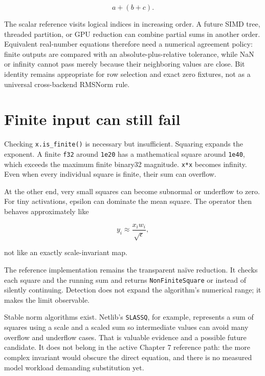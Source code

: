 \begin{equation}
a+(b+c).
\end{equation}

The scalar reference visits logical indices in increasing order. A
future SIMD tree, threaded partition, or GPU reduction can combine
partial sums in another order. Equivalent real-number equations
therefore need a numerical agreement policy: finite outputs are compared
with an absolute-plus-relative tolerance, while NaN or infinity cannot
pass merely because their neighboring values are close. Bit identity
remains appropriate for row selection and exact zero fixtures, not as a
universal cross-backend RMSNorm rule.

\section{Finite input can still
fail}\label{finite-input-can-still-fail}


Checking \texttt{x.is\_finite()} is necessary but insufficient. Squaring
expands the exponent. A finite \texttt{f32} around \texttt{1e20} has a
mathematical square around \texttt{1e40}, which exceeds the maximum
finite binary32 magnitude. \texttt{x*x} becomes infinity. Even when
every individual square is finite, their sum can overflow.

At the other end, very small squares can become subnormal or underflow
to zero. For tiny activations, epsilon can dominate the mean square. The
operator then behaves approximately like

\begin{equation}
y_i\approx\frac{x_iw_i}{\sqrt{\epsilon}},
\end{equation}

not like an exactly scale-invariant map.

The reference implementation remains the transparent naïve reduction. It
checks each square and the running sum and returns
\texttt{NonFiniteSquare} or \texttt{}
instead of silently continuing. Detection does not expand the
algorithm's numerical range; it makes the limit observable.

Stable norm algorithms exist. Netlib's \texttt{SLASSQ}, for example,
represents a sum of squares using a scale and a scaled sum so
intermediate values can avoid many overflow and underflow cases. That is
valuable evidence and a possible future candidate. It does not belong in
the active Chapter 7 reference path: the more complex invariant would
obscure the direct equation, and there is no measured model workload
demanding substitution yet.

